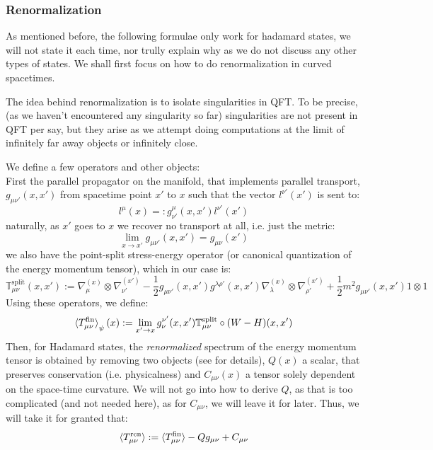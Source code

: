 \documentclass[a4paper,11pt]{article}
\numberwithin{equation}{section}
\theoremstyle{definition}
\begin{document}
\subsubsection{Renormalization}
    As mentioned before, the following formulae only work for hadamard states, we will not state it each time, nor trully explain why as we do not discuss any other types of states. We shall first focus on how to do renormalization in curved spacetimes. 

    The idea behind renormalization is to isolate singularities in QFT. To be precise, (as we haven't encountered any singularity so far) singularities are not present in QFT per say, but they arise as we attempt doing computations at the limit of infinitely far away objects or infinitely close.

    We define a few operators and other objects:\\
    First the parallel propagator on the manifold, that implements parallel transport, $g_{\mu\nu'}(x,x')$ from spacetime point $x'$ to $x$ such that the vector $l^{\nu'}(x')$ is sent to:
    \begin{equation}
    l^{\mu}(x)=:g^\mu_{\nu'}(x,x')l^{\nu'}(x')
    \end{equation}
    naturally, as $x'$ goes to $x$ we recover no transport at all, i.e. just the metric:
    \begin{equation}
    \lim_{x\to x'} g_{\mu\nu'}(x,x')=g_{\mu\nu}(x')
    \end{equation}
    we also have the point-split stress-energy operator (or canonical quantization of the energy momentum tensor), which in our case is:
    \begin{equation}
    \mathbb{T}^\mathrm{split}_{\mu\nu}(x,x'):=\nabla^{(x)}_\mu\otimes\nabla^{(x')}_{\nu'}-\frac{1}{2}g_{\mu\nu'}(x,x')g^{\lambda\rho'}(x,x')\nabla_\lambda^{(x)}\otimes\nabla_{\rho'}^{(x')}+\frac{1}{2}m^2g_{\mu\nu'}(x,x')1\otimes 1
    \end{equation}
    Using these operators, we define:
    \begin{equation}
    \braket{T^\mathrm{fin}_{\mu\nu}}_\psi(x):=\lim_{x'\to x} g_\nu^{\nu'}(x,x')\mathbb{T}^\mathrm{split}_{\mu\nu}\circ(W-H)(x,x')
    \end{equation}
    Then, for Hadamard states, the \emph{renormalized} spectrum of the energy momentum tensor is obtained by removing two objects (see \cite{QCRenorm} for details), $Q(x)$ a scalar, that preserves conservation (i.e. physicalness) and $C_{\mu\nu}(x)$ a tensor solely dependent on the space-time curvature. We will not go into how to derive $Q$, as that is too complicated (and not needed here), as for $C_{\mu\nu}$, we will leave it for later. Thus, we will take it for granted that:
    \begin{equation}\label{T_ren}
    \braket{T^\mathrm{ren}_{\mu\nu}}:=\braket{T^\mathrm{fin}_{\mu\nu}}-Qg_{\mu\nu} + C_{\mu\nu}
    \end{equation}
    
\end{document}
